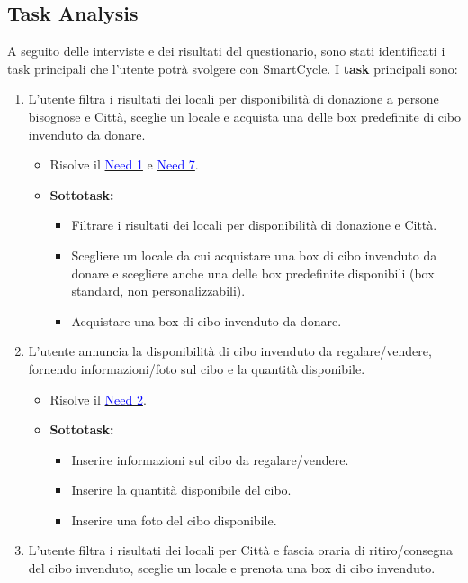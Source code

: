 \documentclass{article}
\begin{document}
\subsection{Task Analysis}
A seguito delle interviste e dei risultati del questionario, sono stati identificati i task principali che l'utente potrà svolgere con SmartCycle.
\newline
I \textbf{task} principali sono:
\begin{enumerate}[label=\textbf{Task-\arabic*}]
    \item L'utente filtra i risultati dei locali per disponibilità di donazione a persone bisognose e Città, sceglie un locale e acquista una delle box predefinite di cibo invenduto da donare.
    \begin{itemize}
        \item Risolve il \hyperref[need1]{\textcolor{blue}{Need 1}} e \hyperref[need7]{\textcolor{blue}{Need 7}}.
        \item \textbf{Sottotask:} 
        \begin{itemize}
            \item Filtrare i risultati dei locali per disponibilità di donazione e Città.
            \item Scegliere un locale da cui acquistare una box di cibo invenduto da donare e scegliere anche una delle box predefinite disponibili (box standard, non personalizzabili).
            \item Acquistare una box di cibo invenduto da donare.
        \end{itemize}
    \end{itemize}
    \item L'utente annuncia la disponibilità di cibo invenduto da regalare/vendere, fornendo informazioni/foto sul cibo e la quantità disponibile.
    \begin{itemize}
        \item Risolve il \hyperref[need2]{\textcolor{blue}{Need 2}}.
        \item \textbf{Sottotask:} 
        \begin{itemize}
            \item Inserire informazioni sul cibo da regalare/vendere.
            \item Inserire la quantità disponibile del cibo.
            \item Inserire una foto del cibo disponibile.
        \end{itemize}
    \end{itemize}
    \item L'utente filtra i risultati dei locali per Città e fascia oraria di ritiro/consegna del cibo invenduto, sceglie un locale e prenota una box di cibo invenduto.

\end{enumerate}
\end{document}
